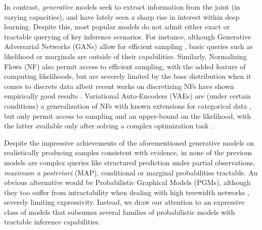 In contrast, \emph{generative} models seek to extract information from the joint (in varying
capacities), and have lately seen a sharp rise in interest within deep learning. Despite this, most
popular models do not admit either exact or tractable querying of key inference scenarios. For
instance, although Generative Adversarial Networks (GANs) allow for efficient sampling
\citep{goodfellow14}, basic queries such as likelihood or marginals are outside of their
capabilities.  Similarly, Normalizing Flows (NF) also permit access to efficient sampling, with the
added feature of computing likelihoods, but are severely limited by the base distribution when it
comes to discrete data \citep{rezende15,papamakarios21} albeit recent works on discretizing NFs
have shown empirically good results \citep{lippe21,ziegler19}. Variational Auto-Encoders (VAEs) are
(under certain conditions) a generalization of NFs \citep{yu20,gritsenko19} with known extensions
for categorical data \citep{rolfe17,vahdat18a,vahdat18b}, but only permit access to sampling and an
upper-bound on the likelihood, with the latter available only after solving a complex optimization
task \citep{kingma14}.

Despite the impressive achievements of the aforementioned generative models on realistically
producing samples consistent with evidence, in none of the previous models are complex queries like
structured prediction under partial observations, \emph{maximum a posteriori} (MAP), conditional or
marginal probabilities tractable. An obvious alternative would be Probabilistic Graphical Models
(PGMs), although they too suffer from intractability when dealing with high treewidth networks
\citep{dechter98,koller09}, severely limiting expressivity. Instead, we draw our attention to an
expressive class of models that subsumes several families of probabilistic models with tractable
inference capabilities.

